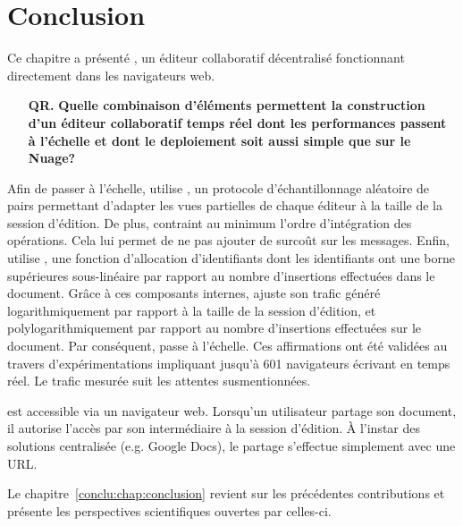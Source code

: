 
\section{Conclusion}
\label{editor:sec:conclusion}

Ce chapitre a présenté \CRATE, un éditeur collaboratif décentralisé fonctionnant
directement dans les navigateurs web.

\begin{itemize}
\item [\textbf{QR.}] \textbf{Quelle combinaison d'éléments permettent la construction
  d'un éditeur collaboratif temps réel dont les performances passent à l'échelle
  et dont le deploiement soit aussi simple que sur le Nuage?}
\end{itemize}

Afin de passer à l'échelle, \CRATE utilise \SPRAY, un protocole
d'échantillonnage aléatoire de pairs permettant d'adapter les vues partielles de
chaque éditeur à la taille de la session d'édition. De plus, \CRATE contraint au
minimum l'ordre d'intégration des opérations. Cela lui permet de ne pas ajouter
de surcoût sur les messages. Enfin, \CRATE utilise \LSEQ, une fonction
d'allocation d'identifiants dont les identifiants ont une borne supérieures
sous-linéaire par rapport au nombre d'insertions effectuées dans le
document. Grâce à ces composants internes, \CRATE ajuste son trafic généré
logarithmiquement par rapport à la taille de la session d'édition, et
polylogarithmiquement par rapport au nombre d'insertions effectuées sur le
document. Par conséquent, \CRATE passe à l'échelle. Ces affirmations ont été
validées au travers d'expérimentations impliquant jusqu'à 601 navigateurs
écrivant en temps réel. Le trafic mesurée suit les attentes susmentionnées.

\CRATE est accessible via un navigateur web. Lorsqu'un utilisateur partage son
document, il autorise l'accès par son intermédiaire à la session d'édition. À
l'instar des solutions centralisée (e.g. Google Docs), le partage s'effectue
simplement avec une URL.

Le chapitre~\ref{conclu:chap:conclusion} revient sur les précédentes
contributions et présente les perspectives scientifiques ouvertes par celles-ci.

